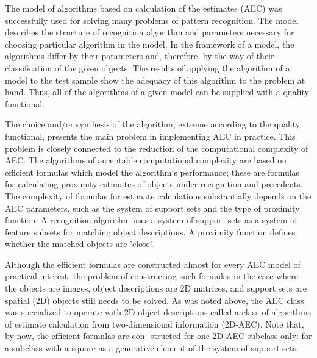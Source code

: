 The model of algorithms based on calculation of the estimates 
(AEC) was successfully used for solving many problems of pattern 
recognition. The model describes the structure of recognition 
algorithm and parameters necessary for choosing particular 
algorithm in the model. In the framework of a model, the algorithms 
differ by their parameters and, therefore, by the way of their 
classification of the given objects. The results of applying the 
algorithm of a model to the test sample show the adequacy of this 
algorithm to the problem at hand. Thus, all of the algorithms 
of a given model can be supplied with a quality functional. 

The choice and/or synthesis of the algorithm, extreme according 
to the quality functional, presents the main problem in implementing 
AEC in practice. This problem is closely connected to the reduction 
of the computational complexity of AEC. The algorithms of acceptable 
computational complexity are based on efficient formulas which model 
the algorithm`s performance; these are formulas for calculating 
proximity estimates of objects under recognition and precedents. 
The complexity of formulas for estimate calculations substantially 
depends on the AEC parameters, such as the system of support 
sets and the type of proximity function. A recognition algorithm 
uses a system of support sets as a system of feature subsets 
for matching object descriptions. A proximity function defines 
whether the matched objects are 'close'. 
% 
% 
  
Although the efficient formulas are constructed almost for every 
AEC model of practical interest, the problem of constructing such 
formulas in the case where the objects are images, object 
descriptions are 2D matrices, and support sets are spatial (2D) 
objects still needs to be solved. As was noted above, the AEC 
class was specialized to operate with 2D object descriptions 
called a class of algorithms of estimate calculation from 
two-dimensional information (2D-AEC). Note that, by now, 
the efficient formulas are con- structed for one 2D-AEC subclass 
only: for a subclass with a square as a generative element of the 
system of support sets.

